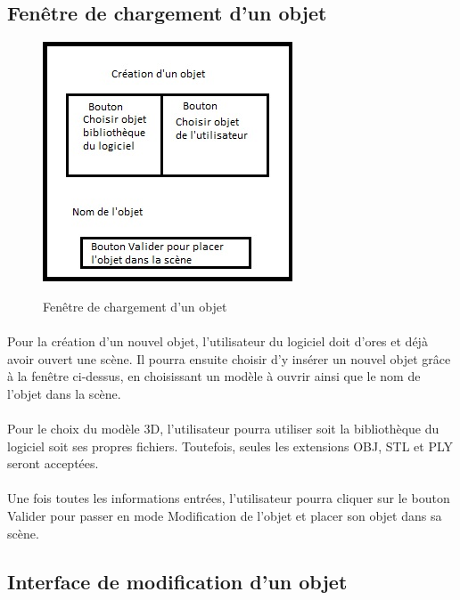 \subsection{Fenêtre de chargement d'un objet}

\begin{figure}[h]
  \centering
  \includegraphics{chargement}
  \label{fig:chargement}
  \caption{Fenêtre de chargement d'un objet}
\end{figure}

\paragraph{}
Pour la création d’un nouvel objet, l’utilisateur du logiciel doit d’ores et déjà avoir ouvert une scène. Il pourra ensuite choisir d’y insérer un nouvel objet grâce à la fenêtre ci-dessus, en choisissant un modèle à ouvrir ainsi que le nom de l’objet dans la scène.

\paragraph{}
Pour le choix du modèle 3D, l’utilisateur pourra utiliser soit la bibliothèque du logiciel soit ses propres fichiers. Toutefois, seules les extensions OBJ, STL et PLY seront acceptées.

\paragraph{}
Une fois toutes les informations entrées, l’utilisateur pourra cliquer sur le bouton Valider pour passer en mode Modification de l’objet et placer son objet dans sa scène.


\subsection{Interface de modification d'un objet}


